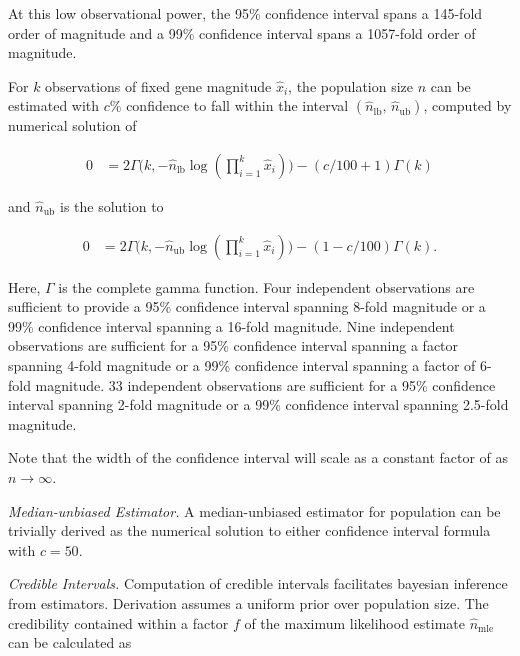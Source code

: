 At this low observational power, the 95\% confidence interval spans a 145-fold order of magnitude and a 99\% confidence interval spans a 1057-fold order of magnitude.

For $k$ observations of fixed gene magnitude $\hat{x}_i$, the population size $n$ can be estimated with $c\%$ confidence to fall within the interval $(\hat{n}_\mathrm{lb}, \, \hat{n}_\mathrm{ub})$, computed by numerical solution of

\begin{footnotesize}
\begin{align} \label{eqn:popsize_mle_ci_lb}
0
&= 2\Gamma\Big(k, -\hat{n}_\mathrm{lb}\log(\prod_{i=1}^k\hat{x}_i)\Big) - (c/100+1)\Gamma(k)
\end{align}
\end{footnotesize}

and $\hat{n}_\mathrm{ub}$ is the solution to

\begin{footnotesize}
\begin{align} \label{eqn:popsize_mle_ci_ub}
  0
  &= 2\Gamma\Big(k, -\hat{n}_\mathrm{ub}\log(\prod_{i=1}^k\hat{x}_i)\Big) - (1-c/100)\Gamma(k).
\end{align}
\end{footnotesize}

Here, $\Gamma$ is the complete gamma function.
Four independent observations are sufficient to provide a 95\% confidence interval spanning 8-fold magnitude or a 99\% confidence interval spanning a 16-fold magnitude.
Nine independent observations are sufficient for a 95\% confidence interval spanning a factor spanning 4-fold magnitude or a 99\% confidence interval spanning a factor of 6-fold magnitude.
33 independent observations are sufficient for a 95\% confidence interval spanning 2-fold magnitude or a 99\% confidence interval spanning 2.5-fold magnitude.

Note that the width of the confidence interval will scale as a constant factor of as $n \to \infty$.

\textit{Median-unbiased Estimator.}
A median-unbiased estimator for population can be trivially derived as the numerical solution to either confidence interval formula with $c = 50$.

\textit{Credible Intervals.}
Computation of credible intervals facilitates bayesian inference from estimators.
Derivation assumes a uniform prior over population size.
The credibility contained within a factor $f$ of the maximum likelihood estimate $\hat{n}_\mathrm{mle}$ can be calculated as

